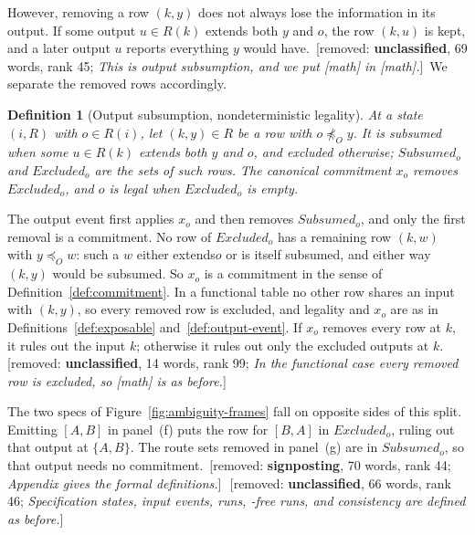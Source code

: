\documentclass[sigconf]{cidr-2027}
\newtheorem{definition}{Definition}
\theoremstyle{remark}
\newcommand{\OutputOrd}{\preceq_O}
\newcommand{\commitment}{commitment\xspace}
\newcommand{\outrel}{extends\xspace}          %
\newcommand{\Subsumed}{\mathit{Subsumed}}
\newcommand{\Excluded}{\mathit{Excluded}}
\newif\ifshowrv \showrvfalse
\newcommand{\rv}[1]{\ifshowrv\textsuperscript{\textcolor{magenta}{\textbf{R#1}}}\fi}
\newcommand{\removednote}[1]{{\color{cutred}\footnotesize\,[removed: #1]\,}}
\begin{document}
\textcolor{newblue}{However, removing a row $(k,y)$\rv{3} does not always lose the information in its output.} \textcolor{newblue}{If
some output $u\in R(k)$ \outrel both $y$ and $o$, the row $(k,u)$ is kept, and
a later output $u$ reports everything $y$ would have.} \removednote{\textbf{unclassified}, 69 words, rank 45; \textit{This is output subsumption, and we put [math] in [math].}} \textcolor{newblue}{We separate the removed
rows accordingly.}

\begin{definition}[Output subsumption, nondeterministic legality]
\label{def:subsumed-excluded}
\textcolor{newblue}{At a state $(i,R)$ with $o\in R(i)$, let $(k,y)\in R$ be a row with
$o\not\OutputOrd y$.} \textcolor{newblue}{It is \emph{subsumed} when some $u\in R(k)$\rv{4} \outrel both $y$ and $o$, and \emph{excluded} otherwise; $\Subsumed_o$
and $\Excluded_o$ are the sets of such rows.} \textcolor{newblue}{The \emph{canonical \commitment}
$x_o$ removes $\Excluded_o$, and $o$ is \emph{legal} when $\Excluded_o$ is
empty.}
\end{definition}

\textcolor{newblue}{The output event first applies $x_o$ and then removes $\Subsumed_o$, and only
the first removal is a \commitment.} \textcolor{newblue}{No row of $\Excluded_o$ has a remaining row
$(k,w)$ with $y\OutputOrd w$: such a $w$ either \outrel $o$ or is itself
subsumed, and either way $(k,y)$ would be subsumed.} \textcolor{newblue}{So $x_o$ is a \commitment
in the sense of Definition~\ref{def:commitment}.} \textcolor{newblue}{In a functional table no
other row shares an input with $(k,y)$, so every removed row is excluded, and
legality and $x_o$ are as in Definitions~\ref{def:exposable}
and~\ref{def:output-event}.} If $x_o$ removes every row at $k$, it rules out the
input $k$; otherwise it rules out only the excluded outputs at $k$. \removednote{\textbf{unclassified}, 14 words, rank 99; \textit{In the functional case every removed row is excluded, so [math] is as before.}}

The two specs of Figure~\ref{fig:ambiguity-frames} fall on opposite sides of this split. Emitting $[A,B]$ in panel~(f) puts the row for $[B,A]$ in $\Excluded_o$, ruling out that output at $\{A,B\}$. \textcolor{newblue}{The route sets removed in panel~(g) are in $\Subsumed_o$, so that output needs no \commitment.} \removednote{\textbf{signposting}, 70 words, rank 44; \textit{Appendix gives the formal definitions.}} \removednote{\textbf{unclassified}, 66 words, rank 46; \textit{Specification states, input events, runs, -free runs, and consistency are defined as before.}}
\end{document}
